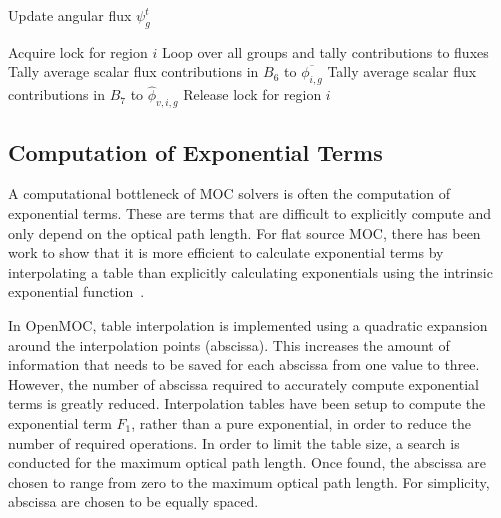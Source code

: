 \begin{algorithm*}[!h]
\begin{algorithmic}
		\State Update angular flux $\psi_g^{t}$ 

		\EndFor
		\vspace{0.1in}
		
		\State Acquire lock for region $i$
		 \Comment Loop over all groups and tally contributions to fluxes
		\vspace{0.1in}
		\State Tally average scalar flux contributions in $B_6$ to $\overline{\phi_{i,g}}$ 
		\State Tally average scalar flux contributions in $B_7$ to $\hat{\phi}_{v,i,g}$ 
		\vspace{0.1in}
		\EndFor
		\vspace{0.1in}
		\State Release lock for region $i$
		
	\end{algorithmic}
\end{algorithm*}

\clearpage
\subsection{Computation of Exponential Terms}
\label{sec:ls-exponential}

A computational bottleneck of \ac{MOC} solvers is often the computation of exponential terms. These are terms that are difficult to explicitly compute and only depend on the optical path length. For flat source \ac{MOC}, there has been work to show that it is more efficient to calculate exponential terms by interpolating a table than explicitly calculating exponentials using the intrinsic exponential function~\cite{boyd2014openmoc}. 

In OpenMOC, table interpolation is implemented using a quadratic expansion around the interpolation points (abscissa). This increases the amount of information that needs to be saved for each abscissa from one value to three. However, the number of abscissa required to accurately compute exponential terms is greatly reduced. Interpolation tables have been setup to compute the exponential term $F_1$, rather than a pure exponential, in order to reduce the number of required operations. In order to limit the table size, a search is conducted for the maximum optical path length. Once found, the abscissa are chosen to range from zero to the maximum optical path length. For simplicity, abscissa are chosen to be equally spaced.

